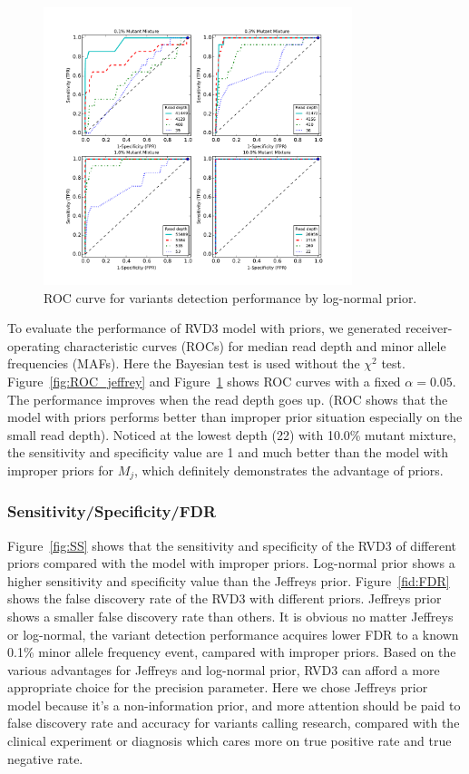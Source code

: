 \documentclass{bioinfo}
\begin{document}
\begin{figure}[htbp]
\begin{center}
\includegraphics[width=90mm]{figs/ROC_without_chi2_lognormal.pdf}
\caption{ROC curve for variants detection performance by log-normal prior.}
\label{fig:ROC_lognormal}
\end{center}
\end{figure}


To evaluate the performance of RVD3 model with priors, we generated receiver-operating characteristic curves (ROCs) for median read depth and minor allele frequencies (MAFs).
Here the Bayesian test is used without the $\chi^2$ test. Figure~\ref{fig:ROC_jeffrey} and Figure~\ref{fig:ROC_lognormal} shows ROC curves with a fixed $\alpha=0.05$.
The performance improves when the read depth goes up. (ROC shows that the model with priors performs better than improper prior situation especially on the small read depth).
Noticed at the lowest depth (22) with 10.0\% mutant mixture, the sensitivity and specificity value are 1 and much better than the model with improper priors for $M_j$, which definitely demonstrates the advantage of priors.

\subsubsection{Sensitivity/Specificity/FDR}

Figure~\ref{fig:SS} shows that the sensitivity and specificity of the RVD3 of different priors compared with the model with improper priors.
Log-normal prior shows a higher sensitivity and specificity value than the Jeffreys prior.
Figure~\ref{fid:FDR} shows the false discovery rate of the RVD3 with different priors. Jeffreys prior shows a smaller false discovery rate than others.
It is obvious no matter Jeffreys or log-normal, the variant detection performance acquires lower FDR to a known 0.1\% minor allele frequency event, campared with improper priors.
Based on the various advantages for Jeffreys and log-normal prior, RVD3 can afford a more appropriate choice for the precision parameter.
Here we chose Jeffreys prior model because it's a non-information prior, and more attention should be paid to false discovery rate and accuracy for variants calling research, compared with the clinical experiment or diagnosis which cares more on true positive rate and true negative rate.
\end{document}
